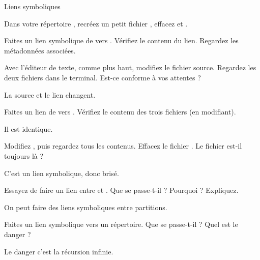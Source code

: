 \begin{exercice}
  \begin{exercicelet}{Liens symboliques}
    \begin{questions}
    \item Dans votre répertoire , recréez
      un petit fichier , effacez  et
      .
    \item Faites un lien symbolique de  vers
      . Vérifiez le contenu du lien. Regardez les
      métadonnées associées.
    \item Avec l'éditeur de texte, comme plus haut, modifiez le fichier
      source. Regardez les deux fichiers dans le terminal. Est-ce
      conforme à vos attentes ?
      \begin{correction}
        La source et le lien changent.
      \end{correction}
    \item Faites un lien de  vers
      . Vérifiez le contenu des trois fichiers (en
      modifiant).
      \begin{correction}
        Il est identique.
      \end{correction}
    \item Modifiez , puis regardez tous les
      contenus. Effacez le fichier . Le fichier
       est-il toujours là ?
      \begin{correction}
        C'est un lien symbolique, donc brisé.
      \end{correction}
    \item Essayez de faire un lien entre  et
      . Que se passe-t-il ? Pourquoi ? Expliquez.
      \begin{correction}
        On peut faire des liens symboliques entre partitions.
      \end{correction}
    \item Faites un lien symbolique vers un répertoire. Que se passe-t-il ? Quel est le danger ?
      \begin{correction}
        Le danger c'est la récursion infinie.
      \end{correction}
    \end{questions}
  \end{exercicelet}
\end{exercice}

